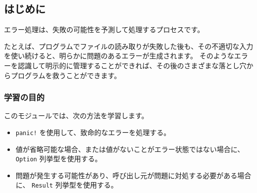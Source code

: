 \subsection{はじめに}

エラー処理は、失敗の可能性を予測して処理するプロセスです。

たとえば、プログラムでファイルの読み取りが失敗した後も、その不適切な入力を使い続けると、明らかに問題のあるエラーが生成されます。 そのようなエラーを認識して明示的に管理することができれば、その後のさまざまな落とし穴からプログラムを救うことができます。

\subsubsection{学習の目的}

このモジュールでは、次の方法を学習します。

\begin{itemize}

\item \texttt{panic!} を使用して、致命的なエラーを処理する。
\item 値が省略可能な場合、または値がないことがエラー状態ではない場合に、 \texttt{Option} 列挙型を使用する。
\item 問題が発生する可能性があり、呼び出し元が問題に対処する必要がある場合に、 \texttt{Result} 列挙型を使用する。


\end{itemize}